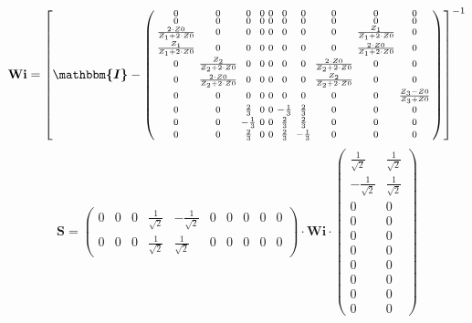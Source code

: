 \[ \mathbf{Wi} =  \left[ \boldsymbol{\mathbbm{I}}  -
\left(\begin{smallmatrix} 0 & 0 & 0 & 0 & 0 & 0 & 0 & 0 & 0 & 0 \\ 0 &
0 & 0 & 0 & 0 & 0 & 0 & 0 & 0 & 0 \\ \frac{2\cdot Z0}{Z_1+2\cdot Z0} &
0 & 0 & 0 & 0 & 0 & 0 & 0 & \frac{Z_1}{Z_1+2\cdot Z0} & 0 \\
\frac{Z_1}{Z_1+2\cdot Z0} & 0 & 0 & 0 & 0 & 0 & 0 & 0 & \frac{2\cdot
Z0}{Z_1+2\cdot Z0} & 0 \\ 0 & \frac{Z_2}{Z_2+2\cdot Z0} & 0 & 0 & 0 &
0 & 0 & \frac{2\cdot Z0}{Z_2+2\cdot Z0} & 0 & 0 \\ 0 & \frac{2\cdot
Z0}{Z_2+2\cdot Z0} & 0 & 0 & 0 & 0 & 0 & \frac{Z_2}{Z_2+2\cdot Z0} & 0
& 0 \\ 0 & 0 & 0 & 0 & 0 & 0 & 0 & 0 & 0 & \frac{ Z_3 -Z0}{ Z_3 +Z0}
\\ 0 & 0 & \frac{2}{3} & 0 & 0 & -\frac{1}{3} & \frac{2}{3} & 0 & 0 &
0 \\ 0 & 0 & -\frac{1}{3} & 0 & 0 & \frac{2}{3} & \frac{2}{3} & 0 & 0
& 0 \\ 0 & 0 & \frac{2}{3} & 0 & 0 & \frac{2}{3} & -\frac{1}{3} & 0 &
0 & 0 \end{smallmatrix}\right) \right]^{-1}  \]
\[ \mathbf{S} = \left(\begin{smallmatrix} 0 & 0 & 0 &
\frac{1}{\sqrt{2}} & -\frac{1}{\sqrt{2}} & 0 & 0 & 0 & 0 & 0 \\ 0 & 0
& 0 & \frac{1}{\sqrt{2}} & \frac{1}{\sqrt{2}} & 0 & 0 & 0 & 0 & 0
\end{smallmatrix}\right) \cdot \mathbf{Wi}
\cdot\left(\begin{smallmatrix} \frac{1}{\sqrt{2}} & \frac{1}{\sqrt{2}}
\\ -\frac{1}{\sqrt{2}} & \frac{1}{\sqrt{2}} \\ 0 & 0 \\ 0 & 0 \\ 0 & 0
\\ 0 & 0 \\ 0 & 0 \\ 0 & 0 \\ 0 & 0 \\ 0 & 0 \end{smallmatrix}\right)
\]
